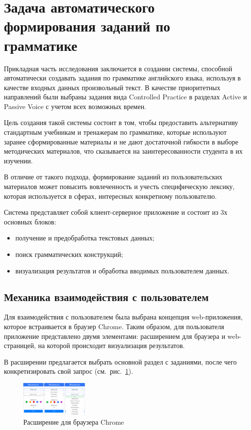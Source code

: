 \section{Задача автоматического формирования заданий по грамматике}
Прикладная часть исследования заключается в создании системы, способной автоматически создавать задания по грамматике английского языка, используя в качестве входных данных произвольный текст. В качестве приоритетных направлений были выбраны задания вида Controlled Practice в разделах Active и Passive Voice с учетом всех возможных времен. 

Цель создания такой системы состоит в том, чтобы предоставить альтернативу стандартным учебникам и тренажерам по грамматике, которые используют заранее сформированные материалы и не дают достаточной гибкости в выборе методических материалов, что сказывается на заинтересованности студента в их изучении. 

В отличие от такого подхода, формирование заданий из пользовательских материалов может повысить вовлеченность и учесть специфическую лексику, которая используется в сферах, интересных конкретному пользователю.

Система представляет собой клиент-серверное приложение и состоит из 3х основных блоков:
\begin{itemize}
  \item получение и предобработка текстовых данных;
  \item поиск грамматических конструкций;
  \item визуализация результатов и обработка вводимых пользователем данных.
\end{itemize}

\subsection{Механика взаимодействия с пользователем}
Для взаимодействия с пользователем была выбрана концепция web-приложения, которое встраивается в браузер Chrome. Таким образом, для пользователя приложение представлено двумя элементами: расширением для браузера и web-страницей, на которой происходит визуализация результатов. 

В расширении предлагается выбрать основной раздел с заданиями, после чего конкретизировать свой запрос (см.~рис.~\ref{fig:ext}). 
\begin{figure}[h]
\centering
\includegraphics[width=0.3\textwidth]{img/ext}
\caption{\label{fig:ext}Расширение для браузера Chrome}
\end{figure}

